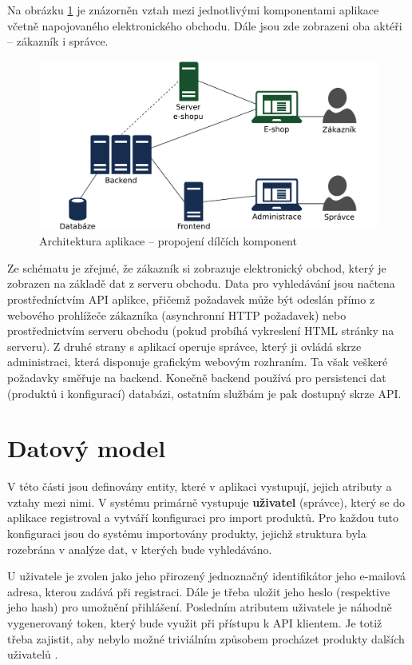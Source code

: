 \documentclass[FM,DP]{tulthesis}
\begin{document}
Na obrázku \ref{architektura} je znázorněn vztah mezi jednotlivými komponentami aplikace včetně
napojovaného elektronického obchodu. Dále jsou zde zobrazeni oba aktéři -- zákazník i správce.

\begin{figure}[h]
\center
\includegraphics[width=\textwidth]{architektura.pdf}
\caption[Architektura aplikace]{Architektura aplikace -- propojení dílčích komponent}
\label{architektura}
\end{figure}

Ze schématu je zřejmé, že zákazník si zobrazuje elektronický obchod, který je zobrazen
na základě dat z serveru obchodu. Data pro vyhledávání jsou načtena prostředníctvím API 
aplikce, přičemž požadavek může být odeslán přímo z webového prohlížeče zákazníka 
(asynchronní HTTP požadavek) nebo prostřednictvím serveru obchodu (pokud probíhá vykreslení 
HTML stránky na serveru). Z druhé strany s aplikací operuje správce, který ji ovládá skrze
administraci, která disponuje grafickým webovým rozhraním. Ta však veškeré požadavky
směřuje na backend. Konečně backend používá pro persistenci dat (produktů i konfigurací)
databázi, ostatním službám je pak dostupný skrze API.

\section{Datový model}

V této části jsou definovány entity, které v aplikaci vystupují, jejich atributy a vztahy mezi 
nimi. V systému primárně vystupuje \textbf{uživatel} (správce), který se do aplikace registroval 
a vytváří konfiguraci pro import produktů. Pro každou tuto konfiguraci jsou do systému
importovány produkty, jejichž struktura byla rozebrána v analýze dat, v kterých bude 
vyhledáváno. 

U uživatele je zvolen jako jeho přirozený jednoznačný identifikátor jeho e-mailová
adresa, kterou zadává při registraci. Dále je třeba uložit jeho heslo (respektive
jeho hash) pro umožnění přihlášení. Posledním atributem uživatele je náhodně vygenerovaný
token, který bude využit při přístupu k API klientem. Je totiž třeba zajistit, 
aby nebylo možné triviálním způsobem procházet produkty dalších uživatelů 
\cite[strana~16]{api}.
\end{document}
